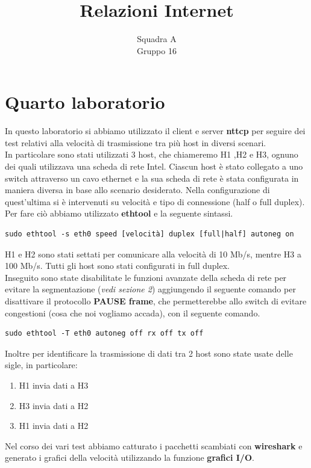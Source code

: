 \documentclass[12pt]{article}
\title{Relazioni Internet}
\author{Squadra A\\Gruppo 16}
\date{}
\begin{document}
\maketitle	
\thispagestyle{fancy}


\newpage

\setcounter{page}{1}
\setlength{\headheight}{0cm}

\section{Quarto laboratorio}
In questo laboratorio si abbiamo utilizzato il client e server \textbf{nttcp} per seguire dei test relativi alla velocità di trasmissione tra più host in diversi scenari.\\
In particolare sono stati utilizzati 3 host, che chiameremo H1 ,H2 e H3, ognuno dei quali utilizzava una scheda di rete Intel. Ciascun host è stato collegato a uno switch attraverso un cavo ethernet e la sua scheda di rete è stata configurata in maniera diversa in base allo scenario desiderato.
Nella configurazione di quest'ultima si è intervenuti su velocità e tipo di connessione (half o full duplex).
Per fare ciò abbiamo utilizzato \textbf{ethtool} e la seguente sintassi.
\begin{verbatim}
sudo ethtool -s eth0 speed [velocità] duplex [full|half] autoneg on
\end{verbatim}
H1 e H2 sono stati settati per comunicare alla velocità di 10 Mb/s, mentre H3 a 100 Mb/s. Tutti gli host sono stati configurati in full duplex.\\
Inseguito sono state disabilitate le funzioni avanzate della scheda di rete per evitare la segmentazione (\textit{vedi sezione 2}) aggiungendo il seguente comando per disattivare il  protocollo \textbf{PAUSE frame}, che permetterebbe allo switch di evitare congestioni (cosa che noi vogliamo accada), con il seguente comando.
\begin{verbatim}
sudo ethtool -T eth0 autoneg off rx off tx off
\end{verbatim}	
Inoltre per identificare la trasmissione di dati tra 2 host sono state usate delle sigle, in particolare:
\renewcommand{\theenumi}{F\arabic{enumi}}
\begin{enumerate}
\item H1 invia dati a H3
\item H3 invia dati a H2
\item H1 invia dati a H2
\end{enumerate}
Nel corso dei vari test abbiamo catturato i pacchetti scambiati con \textbf{wireshark} e generato i grafici della velocità utilizzando la funzione \textbf{grafici I/O}.
\end{document}
